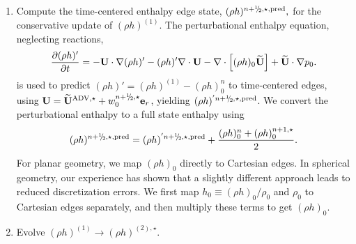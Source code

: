 \begin{description}
\begin{enumerate}
\begin{enumerate}
\renewcommand{\labelenumii}{{\bf \roman{enumii}}.}

\item Compute the time-centered enthalpy edge state, $(\rho h)^{\nph,\star,\pred},$
  for the conservative update of $(\rho h)^{(1)}$.  The perturbational
  enthalpy equation, neglecting reactions,
\begin{equation}
\frac{\partial(\rho h)'}{\partial t} = -{\bf U}\cdot\nabla(\rho h)' - 
   (\rho h)'\nabla\cdot{\bf U} - \nabla\cdot\left[(\rho h)_0\widetilde{{\bf U}}\right] + \widetilde{{\bf U}}\cdot\nabla p_0 
    \label{eq:Perturbational Enthalpy}.
\end{equation}
  is used to predict
  $(\rho h)' = (\rho h)^{(1)} - (\rho h)_0^n$ to time-centered edges, 
  using $\Ub = \uadvone+w_0^{\nph,\star} \eb_r$,
  yielding $(\rho h)^{'\nph,\star,\pred}$.  We convert the perturbational 
  enthalpy to a full state enthalpy using
\begin{equation}
(\rho h)^{\nph,\star,\pred} = (\rho h)^{'\nph,\star,\pred} + \frac{(\rho h)_0^n + (\rho h)_0^{n+1,\star}}{2}.
\end{equation}
  For planar geometry, we map $(\rho h)_0$ directly to Cartesian edges.
  In spherical geometry, our experience has shown that a slightly different
  approach leads to reduced discretization errors.  We first map 
  $h_0 \equiv (\rho h)_0/\rho_0$ and $\rho_0$ to Cartesian edges separately, 
  and then multiply these terms to get $(\rho h)_0$.

\item Evolve $(\rho h)^{(1)} \rightarrow (\rho h)^{(2),\star}$.


\end{enumerate}
\end{enumerate}
\end{description}
